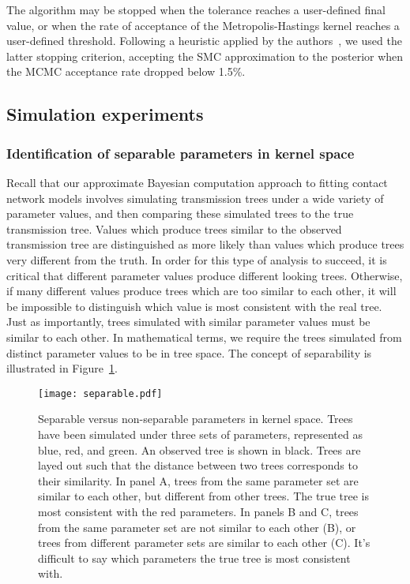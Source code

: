 The algorithm may be stopped when the tolerance reaches a
user-defined final value, or when the rate of acceptance of the
Metropolis-Hastings kernel reaches a user-defined threshold. Following a
heuristic applied by the authors~\autocite{del2012adaptive}, we used the latter
stopping criterion, accepting the SMC approximation to the posterior when the
\gls{MCMC} acceptance rate dropped below 1.5\%.

\subsection{Simulation experiments}

\subsubsection{Identification of separable parameters in kernel space}
\label{subsubsec:kernel}

Recall that our approximate Bayesian computation approach to fitting contact
network models involves simulating transmission trees under a wide variety of
parameter values, and then comparing these simulated trees to the true
transmission tree. Values which produce trees similar to the observed
transmission tree are distinguished as more likely than values which produce
trees very different from the truth. In order for this type of analysis to
succeed, it is critical that different parameter values produce different
looking trees. Otherwise, if many different values produce trees which are too
similar to each other, it will be impossible to distinguish which value is most
consistent with the real tree. Just as importantly, trees simulated with
similar parameter values must be similar to each other. In mathematical terms,
we require the trees simulated from distinct parameter values to be
 in tree space. The concept of separability is illustrated in
Figure~\ref{fig:separable}.

\begin{figure}[ht]
  \centering
  \texttt{[image: separable.pdf]}
  \caption[Separable versus non-separable pararameters in kernel space]{
    Separable versus non-separable parameters in kernel space. Trees have been
    simulated under three sets of parameters, represented as blue, red, and
    green. An observed tree is shown in black. Trees are layed out such that
    the distance between two trees corresponds to their similarity. In panel A,
    trees from the same parameter set are similar to each other, but different
    from other trees. The true tree is most consistent with the red parameters.
    In panels B and C, trees from the same parameter set are not similar to
    each other (B), or trees from different parameter sets are similar to each
    other (C). It's difficult to say which parameters the true tree is most
    consistent with.
  }
  \label{fig:separable}
\end{figure}

